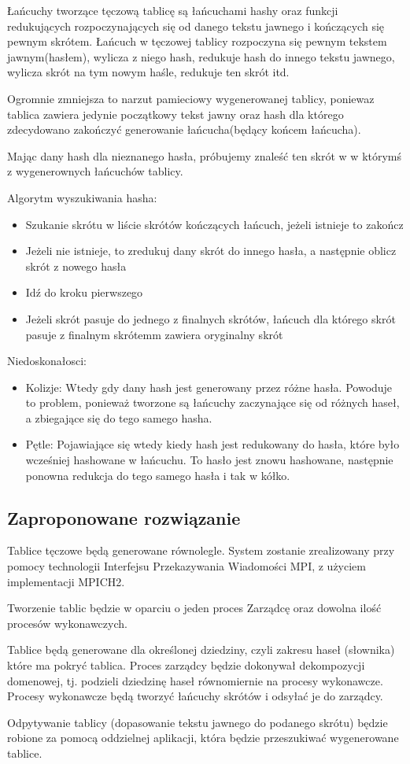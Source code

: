 \documentclass[a4paper,11pt]{article}
\begin{document}
Łańcuchy tworzące tęczową tablicę są łańcuchami hashy oraz funkcji redukujących rozpoczynających się od danego tekstu jawnego i kończących się pewnym skrótem. Łańcuch w tęczowej tablicy rozpoczyna się pewnym tekstem jawnym(hasłem), wylicza z niego hash, redukuje hash do innego tekstu jawnego, wylicza skrót na tym nowym haśle, redukuje ten skrót itd.

Ogromnie zmniejsza to narzut pamieciowy wygenerowanej tablicy, poniewaz tablica zawiera jedynie początkowy tekst jawny oraz hash dla którego zdecydowano zakończyć generowanie łańcucha(będący końcem łańcucha).

Mając dany hash dla nieznanego hasła, próbujemy znaleść ten skrót w w którymś z wygenerownych łańcuchów tablicy.

Algorytm wyszukiwania hasha:
\begin{itemize}
  \item Szukanie skrótu w liście skrótów kończących łańcuch, jeżeli istnieje to zakończ
  \item Jeżeli nie istnieje, to zredukuj dany skrót do innego hasła, a następnie oblicz skrót z nowego hasła
  \item Idź do kroku pierwszego
  \item Jeżeli skrót pasuje do jednego z finalnych skrótów, łańcuch dla którego skrót pasuje z finalnym skrótemm zawiera oryginalny skrót
\end{itemize}

Niedoskonałosci:
\begin{itemize}
  \item Kolizje: Wtedy gdy dany hash jest generowany przez różne hasła. Powoduje to problem, ponieważ tworzone są łańcuchy zaczynające się od różnych haseł, a zbiegające się do tego samego hasha.
  \item Pętle: Pojawiające się wtedy kiedy hash jest redukowany do hasła, które było wcześniej hashowane w łańcuchu. To hasło jest znowu hashowane, następnie ponowna redukcja do tego samego hasła i tak w kółko.
\end{itemize}

\subsection{Zaproponowane rozwiązanie}
Tablice tęczowe będą generowane równolegle. System zostanie zrealizowany przy pomocy technologii Interfejsu Przekazywania Wiadomości MPI, z użyciem implementacji MPICH2.

Tworzenie tablic będzie w oparciu o jeden proces Zarządcę oraz dowolna ilość procesów wykonawczych. 

Tablice będą generowane dla określonej dziedziny, czyli zakresu haseł (słownika) które ma pokryć tablica. Proces zarządcy będzie dokonywał dekompozycji domenowej, tj. podzieli dziedzinę haseł równomiernie na procesy wykonawcze. Procesy wykonawcze będą tworzyć łańcuchy skrótów i odsyłać je do zarządcy.

Odpytywanie tablicy (dopasowanie tekstu jawnego do podanego skrótu) będzie robione za pomocą oddzielnej aplikacji, która będzie przeszukiwać wygenerowane tablice.
\end{document}
